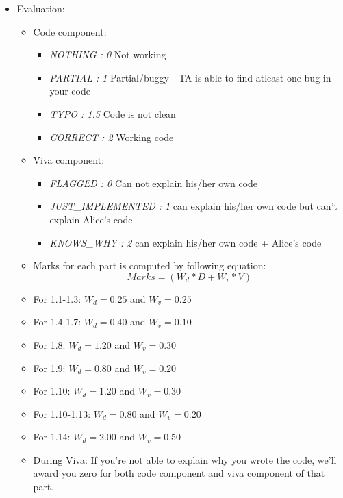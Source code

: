 \documentclass[]{book}
\begin{document}
\begin{itemize}
\itemsep1pt\parskip0pt
\item
  Evaluation:

  \begin{itemize}
  \item
    Code component:

    \begin{itemize}
    \itemsep1pt\parskip0pt
    \item
      \emph{NOTHING : 0 } Not working
    \item
      \emph{PARTIAL : 1 } Partial/buggy - TA is able to find atleast one
      bug in your code
    \item
      \emph{TYPO : 1.5} Code is not clean
    \item
      \emph{CORRECT : 2 } Working code
    \end{itemize}
  \item
    Viva component:

    \begin{itemize}
    \itemsep1pt\parskip0pt
    \item
      \emph{FLAGGED : 0 } Can not explain his/her own code
    \item
      \emph{JUST\_IMPLEMENTED : 1 } can explain his/her own code but
      can't explain Alice's code
    \item
      \emph{KNOWS\_WHY : 2 } can explain his/her own code + Alice's code
    \end{itemize}
  \item
    Marks for each part is computed by following equation:
    \[ Marks = (W_d * D + W_v * V) \]
  \item
    For 1.1-1.3: \(W_d = 0.25\) and \(W_v = 0.25\)
  \item
    For 1.4-1.7: \(W_d = 0.40\) and \(W_v = 0.10\)
  \item
    For 1.8: \(W_d = 1.20\) and \(W_v = 0.30\)
  \item
    For 1.9: \(W_d = 0.80\) and \(W_v = 0.20\)
  \item
    For 1.10: \(W_d = 1.20\) and \(W_v = 0.30\)
  \item
    For 1.10-1.13: \(W_d = 0.80\) and \(W_v = 0.20\)
  \item
    For 1.14: \(W_d = 2.00\) and \(W_v = 0.50\)
  \item
    During Viva: If you're not able to explain why you wrote the code,
    we'll award you zero for both code component and viva component of
    that part.


\end{itemize}
\end{itemize}
\end{document}
